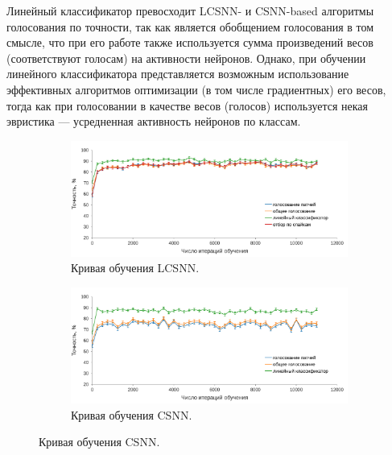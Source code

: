\documentclass[a4paper]{article}
\begin{document}
Линейный классификатор превосходит LCSNN- и CSNN-based алгоритмы голосования по точности, так как является обобщением голосования в том смысле, что при его работе также используется сумма произведений весов (соответствуют голосам) на активности нейронов. Однако, при обучении линейного классификатора представляется возможным использование эффективных алгоритмов оптимизации (в том числе градиентных) его весов, тогда как при голосовании в качестве весов (голосов) используется некая эвристика --- усредненная активность нейронов по классам.

\begin{figure}
\centering
\begin{subfigure}{0.48\textwidth}
    \includegraphics[width=\textwidth,keepaspectratio=true]{LCSNN_learning_rate_ru.pdf}
 \caption{Кривая обучения LCSNN.}
 \label{LCSNN_learning_curve}
\end{subfigure} 
\begin{subfigure}{0.48\textwidth} 
    \includegraphics[width=\textwidth,keepaspectratio=true]{CSNN_learning_rate_ru.pdf}
 \caption{Кривая обучения CSNN.}
 \label{CSNN_learning_curve}
\end{subfigure} 
\end{figure}
\end{document}
